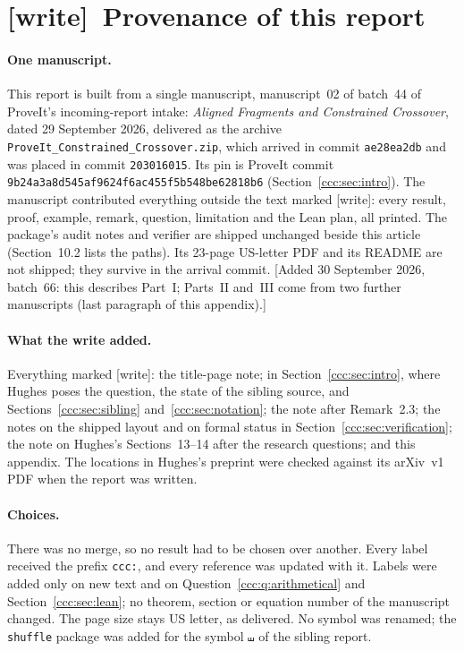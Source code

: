 \documentclass[11pt,letterpaper]{article}
\theoremstyle{definition}
\theoremstyle{remark}
\newcommand{\sh}{\mathbin{\shuffle}}
\newcommand{\wtag}{\textup{[write]}}
\newcommand{\wadd}[1]{\textup{[}Added 30 September 2026, batch~66: #1\textup{]}}
\begin{document}
\section{\texorpdfstring{\wtag\ }{}Provenance of this report}\label{ccc:app:provenance}

\paragraph{One manuscript.} This report is built from a single manuscript,
manuscript~02 of batch~44 of ProveIt's incoming-report intake:
\emph{Aligned Fragments and Constrained Crossover}, dated 29 September 2026,
delivered as the archive \texttt{ProveIt\_Constrained\_Crossover.zip}, which
arrived in commit \texttt{ae28ea2db} and was placed in commit
\texttt{203016015}. Its pin is ProveIt commit
\texttt{9b24a3a8d545af9624f6ac455f5b548be62818b6} (Section~\ref{ccc:sec:intro}).
The manuscript contributed everything outside the text marked \wtag: every
result, proof, example, remark, question, limitation and the Lean plan, all
printed. The package's audit notes and verifier are shipped unchanged beside
this article (Section~10.2 lists the paths). Its 23-page US-letter PDF and its
README are not shipped; they survive in the arrival commit.
\wadd{this describes Part~I; Parts~II and~III come from two further
manuscripts (last paragraph of this appendix).}

\paragraph{What the write added.} Everything marked \wtag: the title-page
note; in Section~\ref{ccc:sec:intro}, where Hughes poses the question, the state
of the sibling source, and Sections~\ref{ccc:sec:sibling}
and~\ref{ccc:sec:notation}; the note after Remark~2.3; the notes on the
shipped layout and on formal status in Section~\ref{ccc:sec:verification}; the
note on Hughes's Sections~13--14 after the research questions; and this
appendix. The locations in Hughes's preprint were checked against its
arXiv~v1 PDF when the report was written.

\paragraph{Choices.} There was no merge, so no result had to be chosen over
another. Every label received the prefix \texttt{ccc:}, and every reference
was updated with it. Labels were added only on new text and on
Question~\ref{ccc:q:arithmetical} and Section~\ref{ccc:sec:lean}; no theorem,
section or equation number of the manuscript changed. The page size stays US
letter, as delivered. No symbol was renamed; the \texttt{shuffle} package was
added for the symbol $\sh$ of the sibling report.
\end{document}
